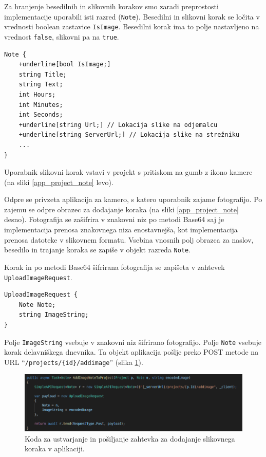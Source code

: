 \documentclass[a4paper, 12pt]{book}
\begin{document}
Za hranjenje besedilnih in slikovnih korakov smo zaradi preprostosti implementacije uporabili isti razred (\texttt{Note}).
Besedilni in slikovni korak se ločita v vrednosti boolean zastavice \texttt{IsImage}.
Besedilni korak ima to polje nastavljeno na vrednost \texttt{false}, slikovni pa na \texttt{true}.

\begin{Verbatim}[commandchars=+\[\]]
Note { 
    +underline[bool IsImage;]
    string Title; 
    string Text; 
    int Hours; 
    int Minutes;
    int Seconds; 
    +underline[string Url;] // Lokacija slike na odjemalcu 
    +underline[string ServerUrl;] // Lokacija slike na strežniku
    ... 
}
\end{Verbatim}

Uporabnik slikovni korak vstavi v projekt s pritiskom na gumb z ikono kamere (na sliki \ref{app_project_note} levo).

Odpre se privzeta aplikacija za kamero, s katero uporabnik zajame fotografijo.
Po zajemu se odpre obrazec za dodajanje koraka (na sliki \ref{app_project_note} desno).
Fotografija se zašifrira v znakovni niz po metodi Base64 saj je implementacija prenosa znakovnega niza enostavnejša, kot implementacija prenosa datoteke v slikovnem formatu.
Vsebina vnosnih polj obrazca za naslov, besedilo in trajanje koraka se zapiše v objekt razreda \texttt{Note}.

Korak in po metodi Base64 šifrirana fotografija se zapišeta v zahtevek \texttt{UploadImageRequest}.

\begin{verbatim}
UploadImageRequest { 
    Note Note; 
    string ImageString; 
}
\end{verbatim}

Polje \texttt{ImageString} vsebuje v znakovni niz šifrirano fotografijo.
Polje \texttt{Note} vsebuje korak delavniškega dnevnika.
Ta objekt aplikacija pošlje preko POST metode na URL \enquote{\texttt{/projects/\{id\}/addimage}} (slika \ref{app_code_image}).

\begin{figure}[H]
\begin{center}
	\includegraphics[width=13.5cm]{app_code_image}
\end{center}
	\caption{Koda za ustvarjanje in pošiljanje zahtevka za dodajanje slikovnega koraka v aplikaciji.}
\label{app_code_image}
\end{figure}
\end{document}
